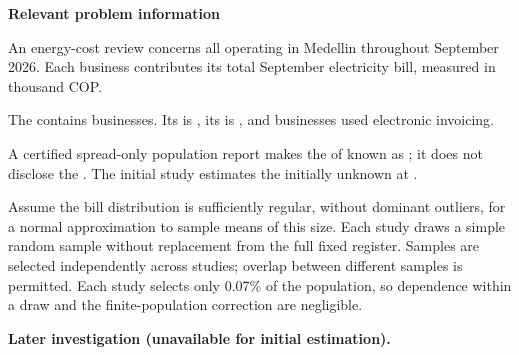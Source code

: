 \secInicio[][sec:p1]

\clearpage



\textbf{Relevant problem information}

\begin{probleminfoexcerpt}
An energy-cost review concerns all     operating in Medellin throughout September 2026. Each business contributes its total September electricity bill, measured in thousand COP.
\end{probleminfoexcerpt}

\begin{probleminfoexcerpt}
The     contains  businesses. Its   is   , its    is   , and  businesses used electronic invoicing.
\end{probleminfoexcerpt}

\begin{probleminfoexcerpt}
A certified spread-only population report makes the    of  known as   ; it does not disclose the   . The initial study estimates the initially unknown   at  .
\end{probleminfoexcerpt}

\begin{probleminfoexcerpt}
Assume the bill distribution is sufficiently regular, without dominant outliers, for a normal approximation to sample means of this size. Each study draws a simple random sample without replacement from the full fixed register. Samples are selected independently across studies; overlap between different samples is permitted. Each study selects only 0.07\% of the population, so dependence within a draw and the finite-population correction are negligible.
\end{probleminfoexcerpt}

\textbf{Later investigation (unavailable for initial estimation).}

